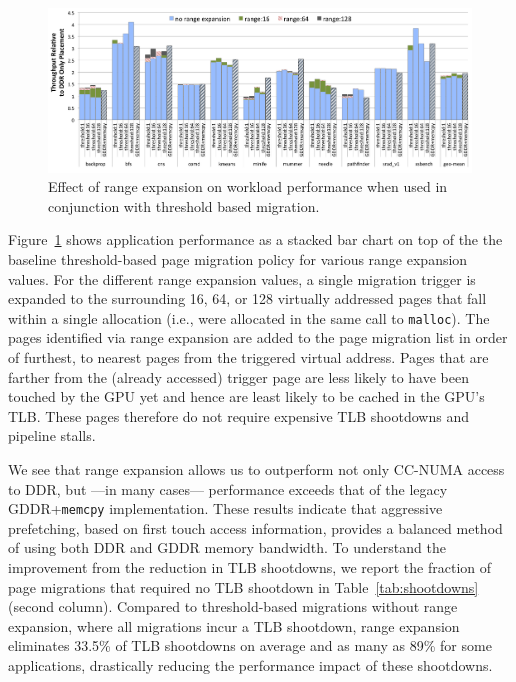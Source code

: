 \begin{figure}[t]
    \includegraphics[width=\textwidth]{hpca2015/figures/thresh-rangeExp.png} 
    \caption{Effect of range expansion on workload performance when used in conjunction with threshold based migration.}
    \label{fig:rangeexpansion}
\end{figure}

Figure~\ref{fig:rangeexpansion} shows application performance as a stacked bar chart on top of the
the baseline threshold-based page migration policy for various range expansion values.
For the different range expansion values, a single migration trigger is expanded to the surrounding 16, 64, or 128 
virtually addressed pages that fall within a single allocation (i.e., were
allocated in the same call to {\tt malloc}).
The pages identified via range expansion are added to the page migration list in order of furthest, 
to nearest pages from the triggered virtual address. Pages that are farther from the (already accessed) trigger
page are less likely to have been touched by the GPU yet and hence are
least likely to be cached in the GPU's TLB. These pages therefore do not
require expensive TLB shootdowns and pipeline stalls.

We see that range expansion allows us to outperform not only CC-NUMA access to DDR, but ---in many cases--- performance
exceeds that of the legacy GDDR+{\tt memcpy} implementation.  These results indicate that aggressive prefetching, 
based on first touch access information, provides a balanced method of using both DDR and GDDR
memory bandwidth.  To understand the improvement 
from the reduction in TLB shootdowns, we report the fraction of 
page migrations that required no TLB shootdown in Table~\ref{tab:shootdowns} (second column).  Compared to  
threshold-based migrations without range expansion, where all migrations incur a TLB shootdown, range expansion 
eliminates 33.5\% of TLB shootdowns on average and as many as 89\% for some applications, drastically 
reducing the performance impact of these shootdowns.

